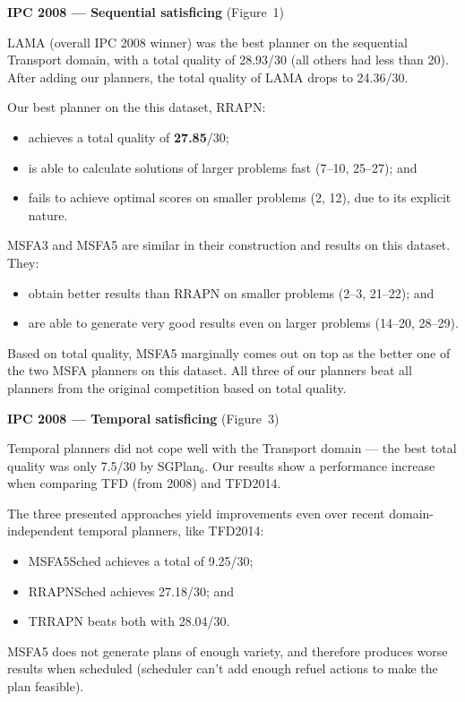 \documentclass[a0paper,fontscale=0.285]{baposter} %
\begin{document}
\begin{poster}
{\begin{multicols}{3}
\textbf{IPC 2008 --- Sequential satisficing} (Figure~1)
\vspace{0.15cm}

LAMA (overall IPC 2008 winner)
was the best planner on the sequential Transport domain, 
with a total quality of 28.93/30 (all others had less than 20).
After adding our planners, the total quality of LAMA drops to 24.36/30.

Our best planner on the this dataset, RRAPN:
\begin{itemize}
\item achieves a total quality of \textbf{27.85}/30;
\item is able to calculate
solutions of larger problems fast (7--10, 25--27); and
\item fails to achieve optimal scores
on smaller problems (2, 12),
due to its explicit nature.
\end{itemize}
MSFA3 and MSFA5 are similar in their construction and results on this dataset. They:
\begin{itemize}
\item obtain better results than RRAPN on smaller problems
(2--3, 21--22); and
\item are able to generate very good results even on larger problems (14--20, 28--29).
\end{itemize}
Based on total quality, MSFA5 marginally comes out on top as the better one of the two MSFA planners on this dataset.
All three of our planners beat all planners from the original competition based on total quality.

\vspace{0.15cm}
\textbf{IPC 2008 --- Temporal satisficing} (Figure~3)
\vspace{0.15cm}

Temporal planners did not cope well with the Transport domain
--- the best total quality was only 7.5/30 by SGPlan$_6$.
Our results show a performance increase when comparing TFD (from 2008) and TFD2014.

The three presented approaches yield improvements even over recent domain-independent temporal planners, like TFD2014:
\begin{itemize}
\item MSFA5Sched achieves a total of 9.25/30;
\item RRAPNSched achieves 27.18/30; and
\item TRRAPN beats both with 28.04/30.
\end{itemize}
MSFA5 does not generate plans of enough variety,
and therefore produces worse results when scheduled
(scheduler can't add enough refuel actions to make the plan feasible).


\end{multicols}}
\end{poster}
\end{document}
